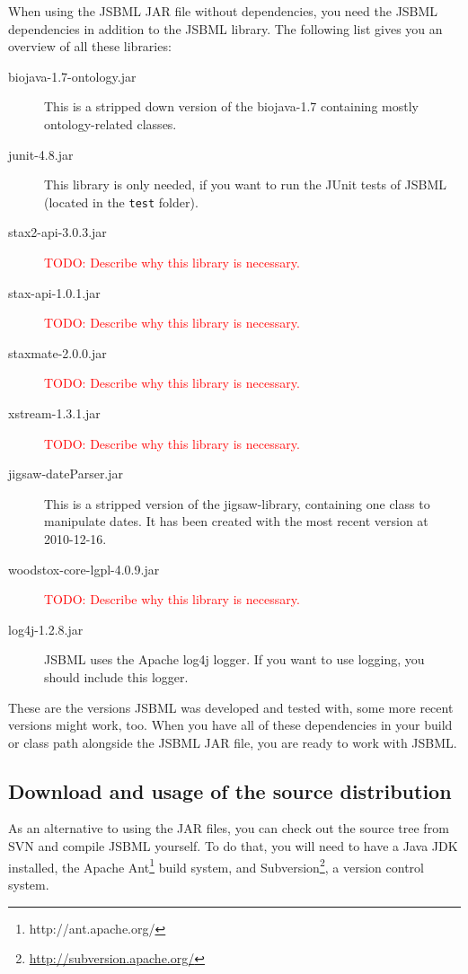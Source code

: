 When using the JSBML JAR file without dependencies, you need the JSBML
dependencies in addition to the JSBML library. The following list gives you an
overview of all these libraries:
\begin{description}
\item[biojava-1.7-ontology.jar] This is a stripped down version of the
biojava-1.7 containing mostly ontology-related classes.
\item[junit-4.8.jar]This library is only needed, if you want to run the JUnit
tests of JSBML (located in the \texttt{test} folder).
\item[stax2-api-3.0.3.jar] \textcolor{red}{TODO: Describe why this library is
necessary.}
\item[stax-api-1.0.1.jar] \textcolor{red}{TODO: Describe why this library is
necessary.}%
\item[staxmate-2.0.0.jar] \textcolor{red}{TODO: Describe why this library is
necessary.}
\item[xstream-1.3.1.jar] \textcolor{red}{TODO: Describe why this library is
necessary.}
\item[jigsaw-dateParser.jar] This is a stripped version of the jigsaw-library,
containing one class to manipulate dates. It has been created with the most
recent version at 2010-12-16.
\item[woodstox-core-lgpl-4.0.9.jar] \textcolor{red}{TODO: Describe why this
library is necessary.}
\item[log4j-1.2.8.jar] JSBML uses the Apache log4j logger. If you want to use
logging, you should include this logger.
\end{description}
These are the versions JSBML was developed and tested with, some more recent
versions might work, too. When you have all of these dependencies in your build
or class path alongside the JSBML JAR file, you are ready to work with JSBML.


\subsection{Download and usage of the source distribution}

As an alternative to using the JAR files, you can check out the source tree from
SVN and compile JSBML yourself. To do that, you will need to have a Java
JDK installed, the Apache
Ant\footnote{http://ant.apache.org/\label{fn:ant}} build system, and
Subversion\footnote{\url{http://subversion.apache.org/}\label{fn:svn}}, a
version control system.

